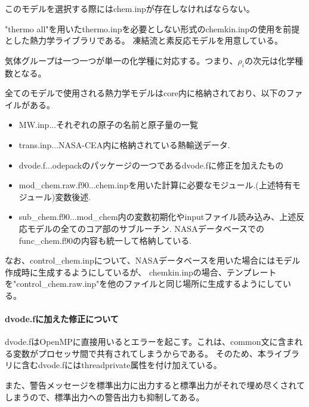 \documentclass{jsarticle}
\begin{document}
このモデルを選択する際にはchem.inpが存在しなければならない。

"thermo all"を用いたthermo.inpを必要としない形式のchemkin.inpの使用を前提とした熱力学ライブラリである。
凍結流と素反応モデルを用意している。

気体グループは一つ一つが単一の化学種に対応する。つまり、$\rho _i$の次元は化学種数となる。

全てのモデルで使用される熱力学モデルはcore内に格納されており、以下のファイルがある。
\begin{itemize}
\item MW.inp...それぞれの原子の名前と原子量の一覧
\item trans.inp...NASA-CEA内に格納されている熱輸送データ.
\item dvode.f...odepackのパッケージの一つであるdvode.fに修正を加えたもの
\item mod\_chem.raw.f90...chem.inpを用いた計算に必要なモジュール.(上述特有モジュール)変数後述.
\item sub\_chem.f90...mod\_chem内の変数初期化やinputファイル読み込み、上述反応モデルの全てのコア部のサブルーチン.
NASAデータベースでのfunc\_chem.f90の内容も統一して格納している.
\end{itemize}

なお、control\_chem.inpについて、NASAデータベースを用いた場合にはモデル作成時に生成するようにしているが、
chemkin.inpの場合、テンプレートを"control\_chem.raw.inp"を他のファイルと同じ場所に生成するようにしている。

\paragraph{dvode.fに加えた修正について}%
dvode.fはOpenMPに直接用いるとエラーを起こす。これは、common文に含まれる変数がプロセッサ間で共有されてしまうからである。
そのため、本ライブラリに含むdvode.fにはthreadprivate属性を付け加えている。

また、警告メッセージを標準出力に出力すると標準出力がそれで埋め尽くされてしまうので、標準出力への警告出力も抑制してある。
\end{document}
